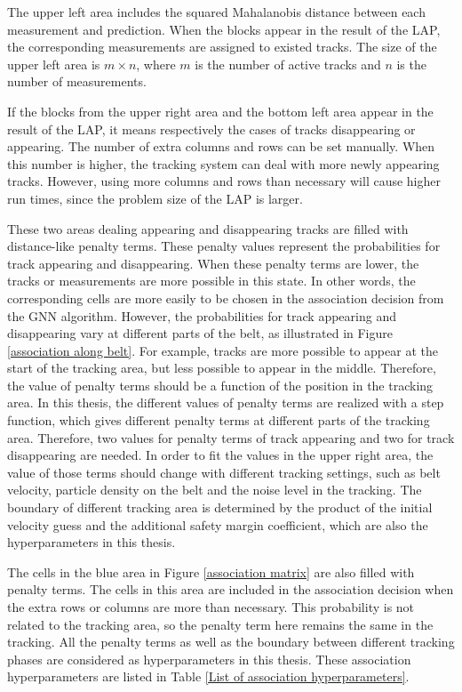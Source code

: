 The upper left area includes the squared Mahalanobis distance between each measurement and prediction. When the blocks appear in the result of the LAP, the corresponding measurements are assigned to existed tracks. The size of the upper left area is $m\times n$, where $m$ is the number of active tracks and $n$ is the number of measurements. 

If the blocks from the upper right area and the bottom left area appear in the result of the LAP, it means respectively the cases of tracks disappearing or appearing. The number of extra columns and rows can be set manually. When this number is higher, the tracking system can deal with more newly appearing tracks. However, using more columns and rows than necessary will cause higher run times, since the problem size of the LAP is larger. 

These two areas dealing appearing and disappearing tracks are filled with distance-like penalty terms. These penalty values represent the probabilities for track appearing and disappearing. When these penalty terms are lower, the tracks or measurements are more possible in this state. In other words, the corresponding cells are more easily to be chosen in the association decision from the GNN algorithm. However, the probabilities for track appearing and disappearing vary at different parts of the belt, as illustrated in Figure \ref{association along belt}. For example, tracks are more possible to appear at the start of the tracking area, but less possible to appear in the middle. Therefore, the value of penalty terms should be a function of the position in the tracking area. In this thesis, the different values of penalty terms are realized with a step function, which gives different penalty terms at different parts of the tracking area. Therefore, two values for penalty terms of track appearing and two for track disappearing are needed. In order to fit the values in the upper right area, the value of those terms should change with different tracking settings, such as belt velocity, particle density on the belt and the noise level in the tracking. The boundary of different tracking area is determined by the product of the initial velocity guess and the additional safety margin coefficient, which are also the hyperparameters in this thesis.

The cells in the blue area in Figure \ref{association matrix} are also filled with penalty terms. The cells in this area are included in the association decision when the extra rows or columns are more than necessary. This probability is not related to the tracking area, so the penalty term here remains the same in the tracking. All the penalty terms as well as the boundary between different tracking phases are considered as hyperparameters in this thesis. These association hyperparameters are listed in Table \ref{List of association hyperparameters}. 

